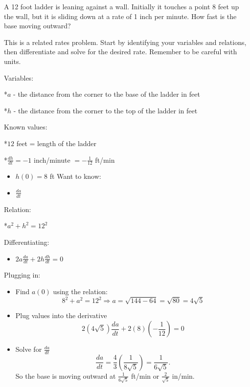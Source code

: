 \documentclass{ximera}
\author{Emma Smith Zbarsky}
\begin{document}
\begin{exercise}

A 12 foot ladder is leaning against a wall. Initially it touches a point
8 feet up the wall, but it is sliding down at a rate of 1 inch per
minute. How fast is the base moving outward?


\begin{hint}
This is a related rates problem. Start by identifying your variables and
relations, then differentiate and solve for the desired rate. Remember
to be careful with units.
\end{hint}


\begin{hint}
Variables:

*$a$ - the distance from the corner to the base of the ladder in feet

*$h$ - the distance from the corner to the top of the ladder in feet

Known values:

*$12$ feet = length of the ladder

*$\frac{dh}{dt} = -1$ inch/minute $=-\frac{1}{12}$ ft/min

\begin{itemize}
\item
  $h(0)=8$ ft Want to know:
\item
  $\frac{da}{dt}$
\end{itemize}

Relation:

*$a^2+h^2 = 12^2$

Differentiating:

\begin{itemize}
\itemsep1pt\parskip0pt
\item
  $2a\frac{da}{dt} +2h\frac{dh}{dt} = 0$
\end{itemize}

Plugging in:

\begin{itemize}
\item
  Find $a(0)$ using the relation:
  \[8^2+a^2 = 12^2 \Rightarrow a = \sqrt{144-64} = \sqrt{80} = 4\sqrt{5}\]
\item
  Plug values into the derivative
  \[2(4\sqrt{5})\frac{da}{dt} + 2(8)\left(-\frac{1}{12}\right) = 0\]
\item
  Solve for $\frac{da}{dt}$
  \[\frac{da}{dt} = \frac{4}{3}\left(\frac{1}{8\sqrt{5}}\right) = \frac{1}{6\sqrt{5}}.\]
  So the base is moving outward at $\frac{1}{6\sqrt{5}}$ ft/min or
  $\frac{2}{\sqrt{5}}$ in/min.
\end{itemize}
\end{hint}


\begin{multipleChoice}
\end{multipleChoice}

\end{exercise}
\end{document}
